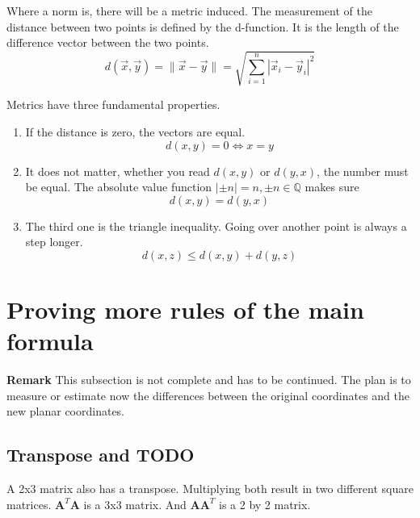 \documentclass[a4paper]{article}
\begin{document}
Where a norm is, there will be a metric induced.
The measurement of the distance between two points is defined by the d-function. It is the length of the difference vector between the two points.\\

\begin{displaymath}
    d(\vec{x}, \vec{y}) = \|\vec{x}-\vec{y}\| = \sqrt{\sum_{i=1}^{n}|\vec{x}_{i}-\vec{y}_{i}|^2}
\end{displaymath}

Metrics have three fundamental properties.
\begin{enumerate}
\item If the distance is zero, the vectors are equal.
\begin{displaymath}
d(x,y) = 0 \iff x = y
\end{displaymath}
\item It does not matter, whether you read $d(x,y)$ or $d(y,x)$, the number must be equal. The absolute value function $|\pm n| = n, \pm n \in \mathbb{Q}$ makes sure
\begin{displaymath}
d(x,y) = d(y,x)
\end{displaymath}
\item The third one is the triangle inequality. Going over another point is always a step longer.
\begin{displaymath}
d(x,z) \leq d(x,y) + d(y,z) 
\end{displaymath}
\end{enumerate}


\section{Proving more rules of the main formula}

\textbf{Remark} This subsection is not complete and has to be continued. The plan is to measure or estimate now the differences between the original coordinates and the new planar coordinates. 

\subsection{Transpose and TODO}

A 2x3 matrix also has a transpose. Multiplying both result in two different square matrices. $\boldsymbol{A}^T\boldsymbol{A}$ is a 3x3 matrix. And $\boldsymbol{A}\boldsymbol{A}^T$ is a 2 by 2 matrix.\\
\end{document}
